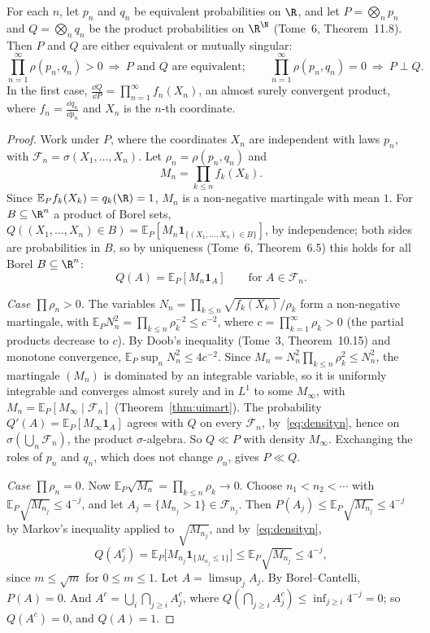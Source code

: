 \begin{theorem}[Kakutani, 1948]\label{thm:kakutani}
For each $n$, let $p_n$ and $q_n$ be equivalent probabilities on $\R$, and let $P=\bigotimes_np_n$ and $Q=\bigotimes_nq_n$ be the product probabilities on $\R^\N$ (Tome~6, Theorem~11.8). Then $P$ and $Q$ are
either equivalent or mutually singular:
\[
\prod_{n=1}^\infty\rho(p_n,q_n)>0\ \Longrightarrow\ P\text{ and }Q\text{ are equivalent};\qquad\prod_{n=1}^\infty\rho(p_n,q_n)=0\ \Longrightarrow\ P\perp Q.
\]
In the first case, $\frac{\dd Q}{\dd P}=\prod_{n=1}^\infty f_n(X_n)$, an almost surely convergent product, where $f_n=\frac{\dd q_n}{\dd p_n}$ and $X_n$ is the $n$-th coordinate.
\end{theorem}
\begin{proof}
Work under $P$, where the coordinates $X_n$ are independent with laws $p_n$, with $\mathcal F_n=\sigma(X_1,\dots,X_n)$. Let $\rho_n=\rho(p_n,q_n)$ and
\[
M_n=\prod_{k\le n}f_k(X_k).
\]
Since $\mathbb E_Pf_k(X_k)=q_k(\R)=1$, $M_n$ is a non-negative martingale with mean $1$. For $B\subseteq\R^n$ a product of Borel sets, $Q((X_1,\dots,X_n)\in B)=\mathbb E_P[M_n\mathbf 1_{\{(X_1,\dots,X_n)\in B\}}]$, by
independence; both sides are probabilities in $B$, so by uniqueness (Tome~6, Theorem~6.5) this holds for all Borel $B\subseteq\R^n$:
\begin{equation}\label{eq:densityn}
Q(A)=\mathbb E_P[M_n\mathbf 1_A]\qquad\text{for }A\in\mathcal F_n.
\end{equation}

\emph{Case $\prod\rho_n>0$.} The variables $N_n=\prod_{k\le n}\sqrt{f_k(X_k)}/\rho_k$ form a non-negative martingale, with $\mathbb E_PN_n^2=\prod_{k\le n}\rho_k^{-2}\le c^{-2}$, where
$c=\prod_{k=1}^\infty\rho_k>0$ (the partial products decrease to $c$). By Doob's inequality (Tome~3, Theorem~10.15) and monotone convergence, $\mathbb E_P\sup_nN_n^2\le4c^{-2}$. Since
$M_n=N_n^2\prod_{k\le n}\rho_k^2\le N_n^2$, the martingale $(M_n)$ is dominated by an integrable variable, so it is uniformly integrable and converges almost surely and in $L^1$ to some $M_\infty$, with
$M_n=\mathbb E_P[M_\infty\mid\mathcal F_n]$ (Theorem~\ref{thm:uimart}). The probability $Q'(A)=\mathbb E_P[M_\infty\mathbf 1_A]$ agrees with $Q$ on every $\mathcal F_n$, by~\eqref{eq:densityn}, hence on $\sigma(\bigcup_n\mathcal F_n)$, the product
$\sigma$-algebra. So $Q\ll P$ with density $M_\infty$. Exchanging the roles of $p_n$ and $q_n$, which does not change $\rho_n$, gives $P\ll Q$.

\emph{Case $\prod\rho_n=0$.} Now $\mathbb E_P\sqrt{M_n}=\prod_{k\le n}\rho_k\to0$. Choose $n_1<n_2<\cdots$ with $\mathbb E_P\sqrt{M_{n_j}}\le4^{-j}$, and let $A_j=\{M_{n_j}>1\}\in\mathcal F_{n_j}$. Then
$P(A_j)\le\mathbb E_P\sqrt{M_{n_j}}\le4^{-j}$ by Markov's inequality applied to $\sqrt{M_{n_j}}$, and by~\eqref{eq:densityn},
\[
Q(A_j^c)=\mathbb E_P\bigl[M_{n_j}\mathbf 1_{\{M_{n_j}\le1\}}\bigr]\le\mathbb E_P\sqrt{M_{n_j}}\le4^{-j},
\]
since $m\le\sqrt m$ for $0\le m\le1$. Let $A=\limsup_jA_j$. By Borel--Cantelli, $P(A)=0$. And $A^c=\bigcup_i\bigcap_{j\ge i}A_j^c$, where $Q(\bigcap_{j\ge i}A_j^c)\le\inf_{j\ge i}4^{-j}=0$; so $Q(A^c)=0$, and $Q(A)=1$.
\end{proof}

